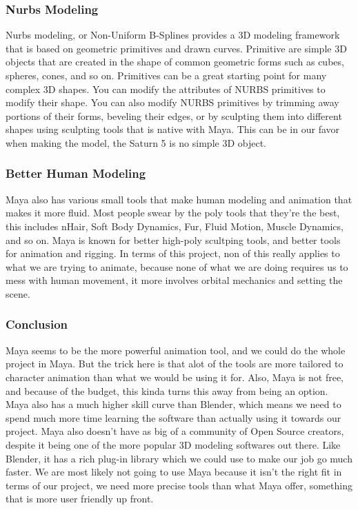 \documentclass[onecolumn, draftclsnofoot,10pt, compsoc]{IEEEtran}
\begin{document}
\subsubsection{Nurbs Modeling}
Nurbs modeling, or Non-Uniform B-Splines provides a 3D modeling framework that is based on geometric primitives and drawn curves. Primitive are simple 3D objects that are created in the shape of common geometric forms such as cubes, spheres, cones, and so on. Primitives can be a great starting point for many complex 3D shapes. You can modify the attributes of NURBS primitives to modify their shape. You can also modify NURBS primitives by trimming away portions of their forms, beveling their edges, or by sculpting them into different shapes using sculpting tools that is native with Maya. This can be in our favor when making the model, the Saturn 5 is no simple 3D object. 
\subsubsection{Better Human Modeling}
Maya also has various small tools that make human modeling and animation that makes it more fluid. Most people swear by the poly tools that they're the best, this includes nHair, Soft Body Dynamics, Fur, Fluid Motion, Muscle Dynamics, and so on. Maya is known for better high-poly scultping tools, and better tools for animation and rigging. In terms of this project, non of this really applies to what we are trying to animate, because none of what we are doing requires us to mess with human movement, it more involves orbital mechanics and setting the scene. 
\subsubsection{Conclusion}
Maya seems to be the more powerful animation tool, and we could do the whole project in Maya. But the trick here is that alot of the tools are more tailored to character animation than what we would be using it for. Also, Maya is not free, and because of the budget, this kinda turns this away from being an option. Maya also has a much higher skill curve than Blender, which means we need to spend much more time learning the software than actually using it towards our project. Maya also doesn't have as big of a community of Open Source creators, despite it being one of the more popular 3D modeling softwares out there. Like Blender, it has a rich plug-in library which we could use to make our job go much faster. We are most likely not going to use Maya because it isn't the right fit in terms of our project, we need more precise tools than what Maya offer, something that is more user friendly up front.  
\end{document}

